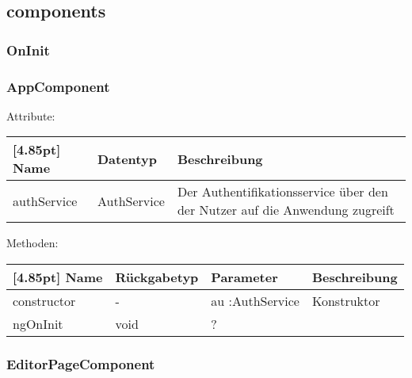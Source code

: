         \subsection{components}
        
            \subsubsection{OnInit}
        
            \subsubsection{AppComponent}
            
                Attribute:
                \begin{center}
                	\renewcommand{\arraystretch}{1.5}
                    \setlength\tabcolsep{5pt}
                	\begin{tabularx}{\textwidth}{|l|l|X|}
                		\hline
                        \rowcolor[gray]{0.75}[4.85pt]            		
                        Name & Datentyp & Beschreibung \\ \hline
                        authService & AuthService & Der Authentifikationsservice über den der Nutzer auf die Anwendung zugreift \\ \hline
                	\end{tabularx}
                \end{center}
                
                Methoden:
        		\begin{center}
                \setlength\tabcolsep{5pt}
                	\renewcommand{\arraystretch}{1.5}
                    	\begin{tabularx}{\textwidth}{|l|l|l|X|}
                    	\hline
                    	\rowcolor[gray]{0.75}[4.85pt]
                		Name & Rückgabetyp & Parameter & Beschreibung \\ \hline 
                        constructor & - & au :AuthService & Konstruktor \\ \hline
                        ngOnInit & void & ? \\ \hline
                        \end{tabularx}
        		\end{center}
        	
        	\subsubsection{EditorPageComponent}
        	
